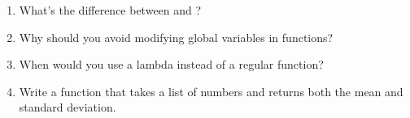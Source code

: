\begin{ponder}
\begin{enumerate}
    \item What's the difference between  and ?
    \item Why should you avoid modifying global variables in functions?
    \item When would you use a lambda instead of a regular function?
    \item Write a function that takes a list of numbers and returns both the mean and standard deviation.
\end{enumerate}
\end{ponder}
